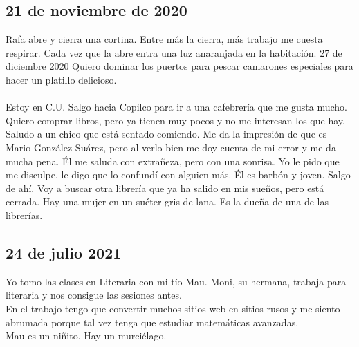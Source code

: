 \documentclass[12pt]{book}
\begin{document}
\subsection*{\hfill 21 de noviembre de 2020}
Rafa abre y cierra una cortina. Entre más la cierra, más trabajo me cuesta respirar. Cada vez que la abre entra una luz anaranjada en la habitación.
27 de diciembre 2020
Quiero dominar los puertos para pescar camarones especiales para hacer un platillo delicioso.
\\
\\
Estoy en C.U. Salgo hacia Copilco para ir a una cafebrería que me gusta mucho. Quiero comprar libros, pero ya tienen muy pocos y no me interesan los que hay. Saludo a un chico que está sentado comiendo. Me da la impresión de que es Mario González Suárez, pero al verlo bien me doy cuenta de mi error y me da mucha pena. Él me saluda con extrañeza, pero con una sonrisa. Yo le pido que me disculpe, le digo que lo confundí con alguien más. Él es barbón y joven.
Salgo de ahí. Voy a buscar otra librería que ya ha salido en mis sueños, pero está cerrada. Hay una mujer en un suéter gris de lana. Es la dueña de una de las librerías.
 
\subsection*{\hfill 24 de julio 2021}
Yo tomo las clases en Literaria con mi tío Mau. Moni, su hermana, trabaja para literaria y nos consigue las sesiones antes. \\
En el trabajo tengo que convertir muchos sitios web en sitios rusos y me siento abrumada porque tal vez tenga que estudiar matemáticas avanzadas.\\
Mau es un niñito. Hay un murciélago.
\end{document}
